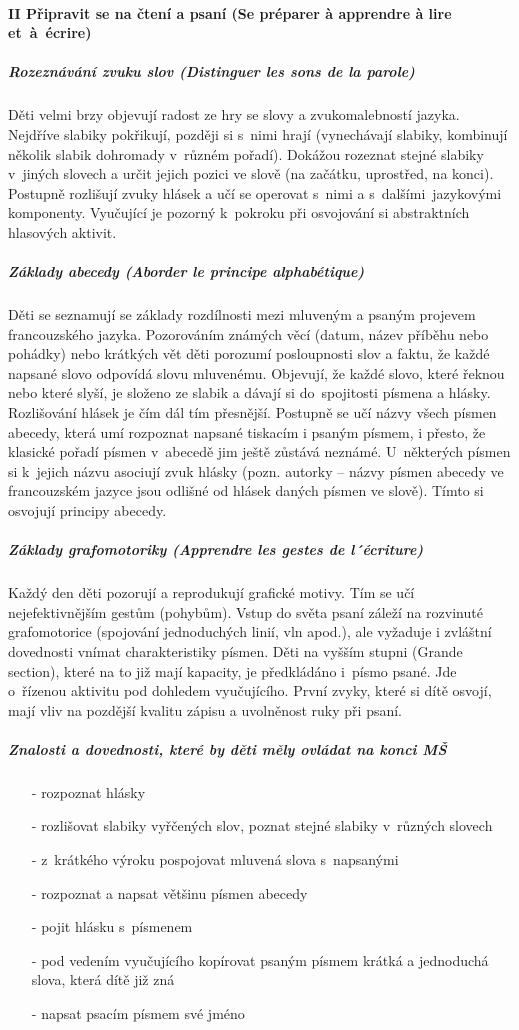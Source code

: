			\paragraph*{II Připravit se na čtení a psaní (Se préparer à apprendre à lire et~à~écrire)}
				\subparagraph{Rozeznávání zvuku slov (Distinguer les sons de la parole)}
					Děti velmi brzy objevují radost ze hry se slovy a zvukomalebností jazyka. Nejdříve slabiky pokřikují, později si s nimi hrají (vynechávají slabiky, kombinují několik slabik dohromady v různém pořadí). Dokážou rozeznat stejné slabiky v jiných slovech a určit jejich pozici ve slově (na začátku, uprostřed, na konci).
					Postupně rozlišují zvuky hlásek a učí se operovat s nimi a s~dalšími jazykovými komponenty. Vyučující je pozorný k pokroku při osvojování si abstraktních hlasových aktivit.
				\subparagraph{Základy abecedy (Aborder le principe alphabétique)}
					Děti se seznamují se základy rozdílnosti mezi mluveným a psaným projevem francouzského jazyka. Pozorováním známých věcí (datum, název příběhu nebo pohádky) nebo krátkých vět děti porozumí posloupnosti slov a faktu, že každé napsané slovo odpovídá slovu mluvenému. 
					Objevují, že každé slovo, které řeknou nebo které slyší, je složeno ze slabik a dávají si do spojitosti písmena a hlásky. Rozlišování hlásek je čím dál tím přesnější. Postupně se učí názvy všech písmen abecedy, která umí rozpoznat napsané tiskacím i psaným písmem, i přesto, že klasické pořadí písmen v abecedě jim ještě zůstává neznámé. U~některých písmen si k~jejich názvu asociují zvuk hlásky (pozn. autorky – názvy písmen abecedy ve francouzském jazyce jsou odlišné od hlásek daných písmen ve slově). Tímto si osvojují principy abecedy.
				\subparagraph{Základy grafomotoriky (Apprendre les gestes de l´écriture)} 
					Každý den děti pozorují a reprodukují grafické motivy. Tím se učí nejefektivnějším gestům (pohybům). Vstup do světa psaní záleží na rozvinuté grafomotorice (spojování jednoduchých linií, vln apod.), ale vyžaduje i zvláštní dovednosti vnímat charakteristiky písmen. 
					Děti na vyšším stupni (Grande section), které na to již mají kapacity, je předkládáno i písmo psané. Jde o~řízenou aktivitu pod dohledem vyučujícího. První zvyky, které si dítě osvojí, mají vliv na pozdější kvalitu zápisu a uvolněnost ruky při psaní. 
					
					\subparagraph{Znalosti a dovednosti, které by děti měly ovládat na konci MŠ}
					\begin{itemize}
						\setlength\itemsep{-2mm}
						\item[-] rozpoznat hlásky
						\item[-] rozlišovat slabiky vyřčených slov, poznat stejné slabiky v různých slovech
						\item[-] z krátkého výroku pospojovat mluvená slova s napsanými
						\item[-] rozpoznat a napsat většinu písmen abecedy
						\item[-] pojit hlásku s písmenem
						\item[-] pod vedením vyučujícího kopírovat psaným písmem krátká a jednoduchá slova, která dítě již zná
						\item[-] napsat psacím písmem své jméno
					\end{itemize}


